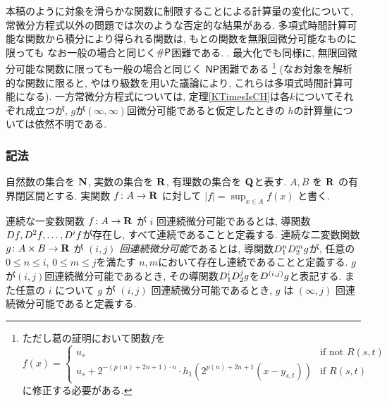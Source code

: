 本稿のように対象を滑らかな関数に制限することによる計算量の変化について,
常微分方程式以外の問題では次のような否定的な結果がある.
多項式時間計算可能な関数から積分により得られる関数は, 
もとの関数を無限回微分可能なものに限っても
なお一般の場合と同じく$\mathsf{\#P}$困難である. 
\cite[定理5.33]{ko1991complexity}.
最大化でも同様に, 
無限回微分可能な関数に限っても一般の場合と同じく
$\mathsf{NP}$困難である\cite[定理3.7]{ko1991complexity}%
\footnote{%
ただし葛\cite[定理3.7]{ko1991complexity}の証明において関数$f$を
\[f(x) = 
\begin{cases}
 u_s & \text{if not } R(s,t) \\
 u_s + 2^{-(p(n)+2n+1)\cdot n} \cdot h_1(2^{p(n)+2n+1} (x - y_{s,t})) & \text{if } R(s,t)
\end{cases}\]
に修正する必要がある.
}
(なお対象を解析的な関数に限ると, 
やはり級数を用いた議論により, 
これらは多項式時間計算可能になる). 
一方常微分方程式については, 
定理\ref{KTimesIsCH}は各$k$についてそれぞれ成立つが, 
$g$が$(\infty, \infty)$回微分可能であると仮定したときの
$h$の計算量については依然不明である. 

\subsubsection*{記法}
自然数の集合を $\mathbf N$, 実数の集合を $\mathbf R$, 
有理数の集合を $\mathbf Q$と表す.
$A, B$ を $\mathbf R$ の有界閉区間とする. 
実関数 $f \colon A \to \mathbf R$ に対して $|f| = \sup_{x \in A} f(x)$ と書く.

連続な一変数関数 $f\colon A \to \mathbf R$ が $i$ 回連続微分可能であるとは,
導関数$D f, D^2 f, \dots, D^i f$が存在し, すべて連続であることと定義する.
連続な二変数関数 $g \colon A \times B \to \mathbf R$ が
\emph{$(i, j)$ 回連続微分可能}であるとは,
導関数$D_1^n D_2^m g$が, 任意の$0 \le n \le i$, $0 \le m \le j$を満たす
$n,m$において存在し連続であることと定義する.
$g$が$(i,j)$回連続微分可能であるとき,
その導関数$D_1^i D_2^j g$を$D^{(i,j)}g$と表記する.
また任意の $i$ について $g$ が $(i, j)$ 回連続微分可能であるとき,
$g$ は $(\infty, j)$ 回連続微分可能であると定義する.

